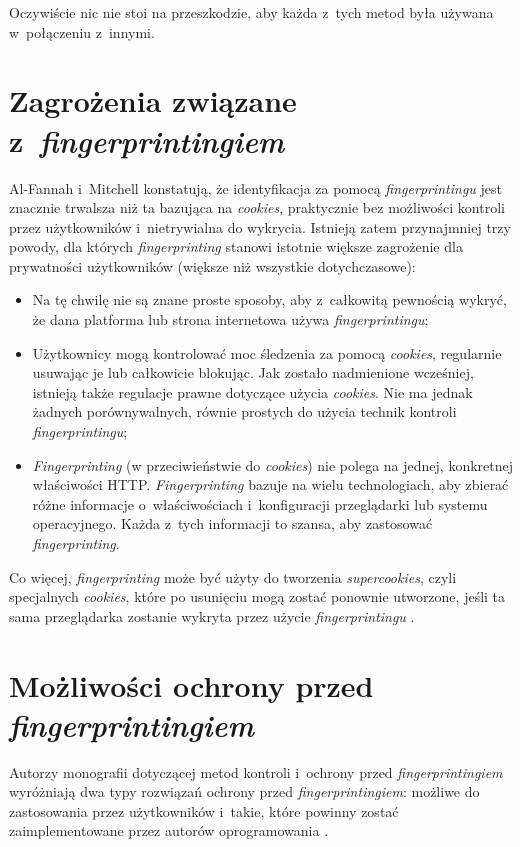 Oczywiście nic nie stoi na przeszkodzie, aby każda z~tych metod była używana
w~połączeniu z~innymi.

\section{Zagrożenia związane z~\emph{fingerprintingiem}}
Al-Fannah i~Mitchell \cite[s. 1]{al2020too} konstatują, że identyfikacja za
pomocą \emph{fingerprintingu} jest znacznie trwalsza niż ta bazująca na
\emph{cookies}, praktycznie bez możliwości kontroli przez użytkowników
i~nietrywialna do wykrycia. Istnieją zatem przynajmniej trzy powody, dla których
\emph{fingerprinting} stanowi istotnie większe zagrożenie dla prywatności
użytkowników (większe niż wszystkie dotychczasowe):
\begin{itemize}
	\item Na tę chwilę nie są znane proste sposoby, aby z~całkowitą pewnością
	      wykryć, że dana platforma lub strona internetowa używa
	      \emph{fingerprintingu};
	\item Użytkownicy mogą kontrolować moc śledzenia za pomocą \emph{cookies},
	      regularnie usuwając je lub całkowicie blokując. Jak zostało
	      nadmienione wcześniej, istnieją także regulacje prawne dotyczące
	      użycia \emph{cookies}. Nie ma jednak żadnych porównywalnych, równie
	      prostych do użycia technik kontroli \emph{fingerprintingu};
	\item \emph{Fingerprinting} (w przeciwieństwie do \emph{cookies}) nie polega
	      na jednej, konkretnej właściwości HTTP. \emph{Fingerprinting} bazuje
	      na wielu technologiach, aby zbierać różne informacje o~właściwościach
	      i~konfiguracji przeglądarki lub systemu operacyjnego. Każda z~tych
	      informacji to szansa, aby zastosować \emph{fingerprinting}.
\end{itemize}

Co więcej, \emph{fingerprinting} może być użyty do tworzenia
\emph{supercookies}, czyli specjalnych \emph{cookies}, które po usunięciu mogą
zostać ponownie utworzone, jeśli ta sama przeglądarka zostanie wykryta przez
użycie \emph{fingerprintingu} \cite[s. 2]{al2020too}.

\section{Możliwości ochrony przed \emph{fingerprintingiem}}
Autorzy monografii dotyczącej metod kontroli i~ochrony przed
\emph{fingerprintingiem} wyróżniają dwa typy rozwiązań ochrony przed
\emph{fingerprintingiem}: możliwe do zastosowania przez użytkowników i~takie,
które powinny zostać zaimplementowane przez autorów oprogramowania
\cite{al2020too}.

